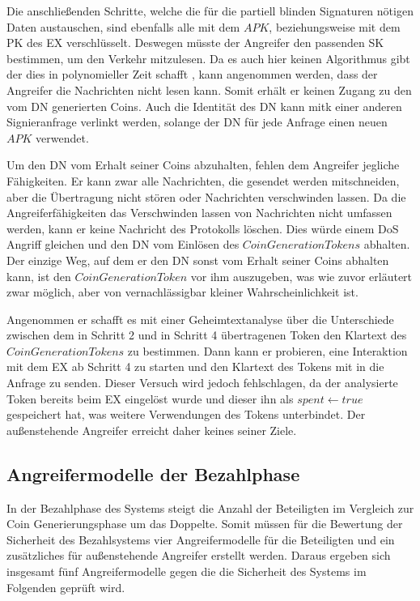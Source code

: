 \documentclass[
	fontsize=11pt,
	headings=small,
	parskip=half,           %
	bibliography=totoc,
	numbers=noenddot,       %
	open=any,               %
]{scrreprt}
\begin{document}
Die anschließenden Schritte, welche die für die partiell blinden Signaturen nötigen Daten austauschen, sind ebenfalls alle mit dem $APK$, beziehungsweise mit dem PK des EX verschlüsselt. Deswegen müsste der Angreifer den passenden SK bestimmen, um den Verkehr mitzulesen. Da es auch hier keinen Algorithmus gibt der dies in polynomieller Zeit schafft \cite{ecc-bos2009security}, kann angenommen werden, dass der Angreifer die Nachrichten nicht lesen kann. Somit erhält er keinen Zugang zu den vom DN generierten Coins. Auch die Identität des DN kann mitk einer anderen Signieranfrage verlinkt werden, solange der DN für jede Anfrage einen neuen $APK$ verwendet.

Um den DN vom Erhalt seiner Coins abzuhalten, fehlen dem Angreifer jegliche Fähigkeiten. Er kann zwar alle Nachrichten, die gesendet werden mitschneiden, aber die Übertragung nicht stören oder Nachrichten verschwinden lassen. Da die Angreiferfähigkeiten das Verschwinden lassen von Nachrichten nicht umfassen werden, kann er keine Nachricht des Protokolls löschen. Dies würde einem DoS Angriff gleichen und den DN vom Einlösen des $CoinGenerationTokens$ abhalten. Der einzige Weg, auf dem er den DN sonst vom Erhalt seiner Coins abhalten kann, ist den $CoinGenerationToken$ vor ihm auszugeben, was wie zuvor erläutert zwar möglich, aber von vernachlässigbar kleiner Wahrscheinlichkeit ist.

Angenommen er schafft es mit einer Geheimtextanalyse über die Unterschiede zwischen dem in Schritt 2 und in Schritt 4 übertragenen Token den Klartext des $CoinGenerationTokens$ zu bestimmen. Dann kann er probieren, eine Interaktion mit dem EX ab Schritt 4 zu starten und den Klartext des Tokens mit in die Anfrage zu senden. Dieser Versuch wird jedoch fehlschlagen, da der analysierte Token bereits beim EX eingelöst wurde und dieser ihn als $spent\leftarrow true$ gespeichert hat, was weitere Verwendungen des Tokens unterbindet. Der außenstehende Angreifer erreicht daher keines seiner Ziele.

\subsection{Angreifermodelle der Bezahlphase}
\label{subsec:adversaryPayment}
In der Bezahlphase des Systems steigt die Anzahl der Beteiligten im Vergleich zur Coin Generierungsphase um das Doppelte. Somit müssen für die Bewertung der Sicherheit des Bezahlsystems vier Angreifermodelle für die Beteiligten und ein zusätzliches für außenstehende Angreifer erstellt werden. Daraus ergeben sich insgesamt fünf Angreifermodelle gegen die die Sicherheit des Systems im Folgenden geprüft wird.
\end{document}
